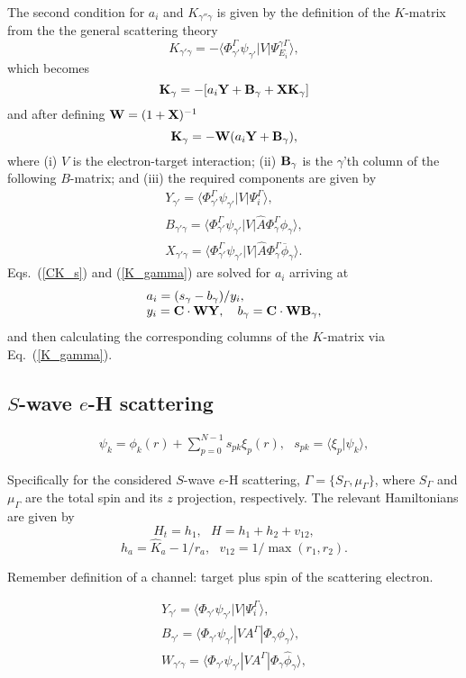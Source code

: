 \documentclass[aip
, pra
, showpacs
, aps
, twocolumn
, groupedaddress
, floatfix
]{revtex4}
\newcommand{\beq}{\begin{equation}}
\newcommand{\eeq}{\end{equation}}
\newcommand{\barr}{\begin{array}}
\newcommand{\earr}{\end{array}}
\begin{document}
The second condition for $a_i$ and $K_{\gamma'' \gamma}$ is given by the definition of the $K$-matrix from the the general scattering theory \cite{N82}
\beq
K_{\gamma' \gamma} = - \langle \Phi^\Gamma_{\gamma'}  \psi_{\gamma'}
| V | \Psi_{E_i}^{\gamma \Gamma} \rangle,
\eeq
which becomes
\beq
{\bf K}_\gamma = -[a_i {\bf Y} + {\bf B}_\gamma + {\bf X K}_\gamma]
\eeq
and after defining ${\bf W}=(1+{\bf X})^{-1}$
\beq
{\bf K}_\gamma  = -{\bf W}   (a_i {\bf Y}    + {\bf B}_\gamma), \label{K_gamma}
\eeq
where (i) $V$ is the electron-target interaction; (ii) ${\bf B}_\gamma$ is the $\gamma$'th column of the following $B$-matrix;
and (iii) the required components are given by
\beq \barr{l}
Y_{\gamma'} = \langle \Phi^\Gamma_{\gamma'}  \psi_{\gamma'} |V |\Psi_i^{\Gamma} \rangle,\\
B_{\gamma' \gamma} = \langle \Phi^\Gamma_{\gamma'}  \psi_{\gamma'} |V | \hat{A} \Phi^\Gamma_{\gamma} \phi_{\gamma} \rangle,\\
X_{\gamma' \gamma} = \langle \Phi^\Gamma_{\gamma'}  \psi_{\gamma'} |V | \hat{A} \Phi^\Gamma_{\gamma} \overline{\phi}_{\gamma} \rangle.
\earr \label{Y_B_W} \eeq
Eqs.~(\ref{CK_s}) and (\ref{K_gamma}) are solved for $a_i$ arriving at
\beq \barr{l}
a_i = (s_\gamma - b_\gamma) / y_i,\\
y_i = {\bf C} \cdot {\bf W}  {\bf Y}, \ \ \ 
b_\gamma = {\bf C} \cdot {\bf W}  {\bf B}_\gamma,
\earr \eeq
and then calculating the corresponding columns of the $K$-matrix via Eq.~(\ref{K_gamma}).



\subsection{$S$-wave $e$-H scattering}

\beq \barr{l}
\psi_k = \phi_k(r) +  \sum_{p=0}^{N-1} s_{pk} \xi_p(r), \ \ \ s_{pk} = \langle \xi_p | \psi_k \rangle,
\earr \label{Psi_} \eeq


Specifically for the considered $S$-wave $e$-H scattering,
$\Gamma=\{S_\Gamma,\mu_\Gamma\}$, where $S_\Gamma$ and $\mu_\Gamma$ are the total spin and its $z$ projection, respectively.
The relevant Hamiltonians are given by
\beq
H_t = h_1, \ \ \ H = h_1 + h_2 + v_{12},
\label{H_t} \eeq
\beq
h_a = \hat{K}_a  - 1/r_a,\ \ \ v_{12} = 1/\max{(r_{1}, r_{2})}.
\label{h_b} \eeq


Remember definition of a channel: target plus spin of the scattering electron.


\beq \barr{l}
Y_{\gamma'} = \langle \Phi_{\gamma'}  \psi_{\gamma'} |V|\Psi_i^{\Gamma} \rangle,\\
B_{\gamma'} = \langle  \Phi_{\gamma'}  \psi_{\gamma'} |VA^{\Gamma} |\Phi_{\gamma} \phi_{\gamma} \rangle,\\
W_{\gamma' \gamma} = \langle \Phi_{\gamma'}  \psi_{\gamma'} |V A^{\Gamma} |\Phi_{\gamma} \widehat{\phi}_{\gamma} \rangle,\\
\earr \label{Psi_} \eeq
\end{document}
